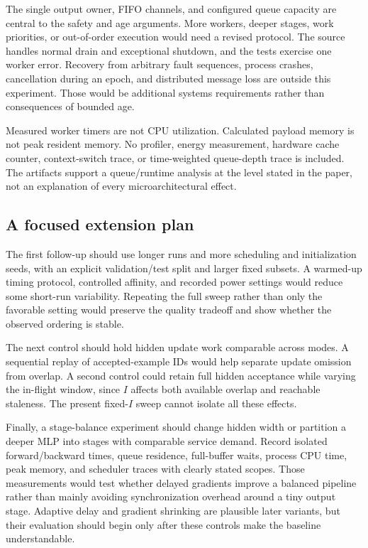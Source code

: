 \documentclass[conference]{IEEEtran}
\begin{document}
The single output owner, FIFO channels, and configured queue capacity are central to the safety and age arguments. More workers, deeper stages, work priorities, or out-of-order execution would need a revised protocol. The source handles normal drain and exceptional shutdown, and the tests exercise one worker error. Recovery from arbitrary fault sequences, process crashes, cancellation during an epoch, and distributed message loss are outside this experiment. Those would be additional systems requirements rather than consequences of bounded age.

Measured worker timers are not CPU utilization. Calculated payload memory is not peak resident memory. No profiler, energy measurement, hardware cache counter, context-switch trace, or time-weighted queue-depth trace is included. The artifacts support a queue/runtime analysis at the level stated in the paper, not an explanation of every microarchitectural effect.

\subsection{A focused extension plan}
The first follow-up should use longer runs and more scheduling and initialization seeds, with an explicit validation/test split and larger fixed subsets. A warmed-up timing protocol, controlled affinity, and recorded power settings would reduce some short-run variability. Repeating the full sweep rather than only the favorable setting would preserve the quality tradeoff and show whether the observed ordering is stable.

The next control should hold hidden update work comparable across modes. A sequential replay of accepted-example IDs would help separate update omission from overlap. A second control could retain full hidden acceptance while varying the in-flight window, since $I$ affects both available overlap and reachable staleness. The present fixed-$I$ sweep cannot isolate all these effects.

Finally, a stage-balance experiment should change hidden width or partition a deeper MLP into stages with comparable service demand. Record isolated forward/backward times, queue residence, full-buffer waits, process CPU time, peak memory, and scheduler traces with clearly stated scopes. Those measurements would test whether delayed gradients improve a balanced pipeline rather than mainly avoiding synchronization overhead around a tiny output stage. Adaptive delay and gradient shrinking are plausible later variants, but their evaluation should begin only after these controls make the baseline understandable.
\end{document}

